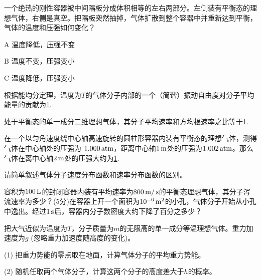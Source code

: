 \documentclass[CJK]{beamer}
\begin{document}
\begin{frame}
\bchL
一个绝热的刚性容器被中间隔板分成体积相等的左右两部分。左侧装有平衡态的理想气体，右侧是真空。把隔板突然抽掉，气体扩散到整个容器中并重新达到平衡，气体的温度和压强如何变化？
\bitem
\item[A]{温度降低，压强不变}
\item[B]{温度不变，压强变小}
\item[C]{温度降低，压强变小}
  \eitem
\echL
\end{frame}

\begin{frame}
\bchL
根据能均分定理，温度为$T$的气体分子内部的一个（简谐）振动自由度对分子平均能量的贡献为\uline{1}.
\echL
\end{frame}


\begin{frame}
\bchL
处于平衡态的单一成分二维理想气体，其分子平均速率和方均根速率之比等于\uline{1}.
\echL
\end{frame}


\begin{frame}
\bchL
在一个以匀角速度绕中心轴高速旋转的圆柱形容器内装有平衡态的理想气体，测得气体在中心轴处的压强为 $1.000\,\mathrm{atm}$，距离中心轴$1\,\mathrm{m}$处的压强为$1.002\,\mathrm{atm}$。那么气体在离中心轴$2\,\mathrm{m}$处的压强大约为\uline{1}.
\echL
\end{frame}


\begin{frame}
\bchL
请简单叙述气体分子速度分布函数和速率分布函数的区别。
\echL
\end{frame}

\begin{frame}
\bchL
容积为$100\,\mathrm{L}$的封闭容器内装有平均速率为$800\,\mathrm{m}/\,\mathrm{s}$的平衡态理想气体，其分子泻流速率为多少？(5分)在容器上开一个面积为$10^{-6}\,\mathrm{m}^2$的小孔，气体分子开始从小孔中逸出。经过$1\,\mathrm{s}$后，容器内分子数密度大约下降了百分之多少？
\echL
\end{frame}


\begin{frame}
\bchL
把大气近似为温度为$T$，分子质量为$m$的无限高的单一成分等温理想气体。重力加速度为$g$ (忽略重力加速度随高度的变化)。
\bitem
\item[(1)]{把重力势能的零点取在地面，计算气体分子的平均重力势能。}
\item[(2)]{随机任取两个气体分子，计算这两个分子的高度差大于$h$的概率。}  
\eitem
\echL
\end{frame}
\end{document}
